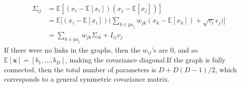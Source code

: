 \documentclass{article}
\begin{document}
\begin{example}
    \begin{align*} 
      \Sigma_{ij} & = \mathbb{E}[ (x_i - \mathbb{E}[x_i]) (x_j - \mathbb{E}[x_j])] \\
                  & = \mathbb{E} \bigg[ (x_i - \mathbb{E}[x_i]) \bigg( \sum_{k \in \mathrm{pa}_j} w_{j k} (x_k - \mathbb{E}[x_k])  + \sqrt{v_i} \epsilon_j\bigg) \bigg] \\
                  & = \sum_{k \in \mathrm{pa}_j} w_{j k} \Sigma_{ik} + I_{ij} v_j
    \end{align*}
    If there were no links in the graphs, then the $w_{ij}$'s are $0$, and so $\mathbb{E}[\mathbf{x}] = [b_1, \ldots, b_D]$, making the covariance diagonal.If the graph is fully connected, then the total number of parameters is $D + D(D-1)/2$, which corresponds to a general symmetric covariance matrix.  
  \end{example}
\end{document}

